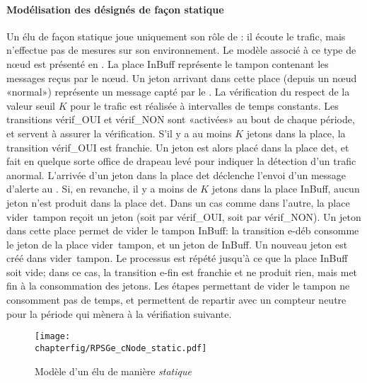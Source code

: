             \paragraph{Modélisation des \cns désignés de façon statique}
Un \cn élu de façon statique joue uniquement son rôle de \cn: il écoute le trafic, mais n'effectue pas de mesures sur son environnement.
Le modèle \rpsge associé à ce type de nœud est présenté en .
La place \textsf{InBuff} représente le tampon contenant les messages reçus par le nœud.
Un jeton arrivant dans cette place (depuis un nœud «normal») représente un message capté par le \cn.
La vérification du respect de la valeur seuil $K$ pour le trafic est réalisée à intervalles de temps constants.
Les transitions \textsf{vérif\_OUI} et \textsf{vérif\_NON} sont «activées» au bout de chaque période, et servent à assurer la vérification.
S'il y a au moins $K$ jetons dans la place, la transition \textsf{vérif\_OUI} est franchie.
Un jeton est alors placé dans la place \textsf{det}, et fait en quelque sorte office de drapeau levé pour indiquer la détection d'un trafic anormal.
L'arrivée d'un jeton dans la place \textsf{det} déclenche l'envoi d'un message d'alerte au \ch.
Si, en revanche, il y a moins de $K$ jetons dans la place \textsf{InBuff}, aucun jeton n'est produit dans la place \textsf{det}.
Dans un cas comme dans l'autre, la place \textsf{vider~tampon} reçoit un jeton (soit par \textsf{vérif\_OUI}, soit par \textsf{vérif\_NON}).
Un jeton dans cette place permet de vider le tampon \textsf{InBuff}: la transition \textsf{e-déb} consomme le jeton de la place \textsf{vider~tampon}, et un jeton de \textsf{InBuff}.
Un nouveau jeton est créé dans \textsf{vider~tampon}.
Le processus est répété jusqu'à ce que la place \textsf{InBuff} soit vide; dans ce cas, la transition \textsf{e-fin} est franchie et ne produit rien, mais met fin à la consommation des jetons.
Les étapes permettant de vider le tampon ne consomment pas de temps, et permettent de repartir avec un compteur neutre pour la période qui mènera à la vérifiation suivante.
\begin{figure}[ht]
    \centering
    \texttt{[image: \\chapterfig/RPSGe\_cNode\_static.pdf]}
    \caption{Modèle \rpsge d'un \cn élu de manière \emph{statique}}\label{sa:fig:cnodegspn1}
\end{figure}

